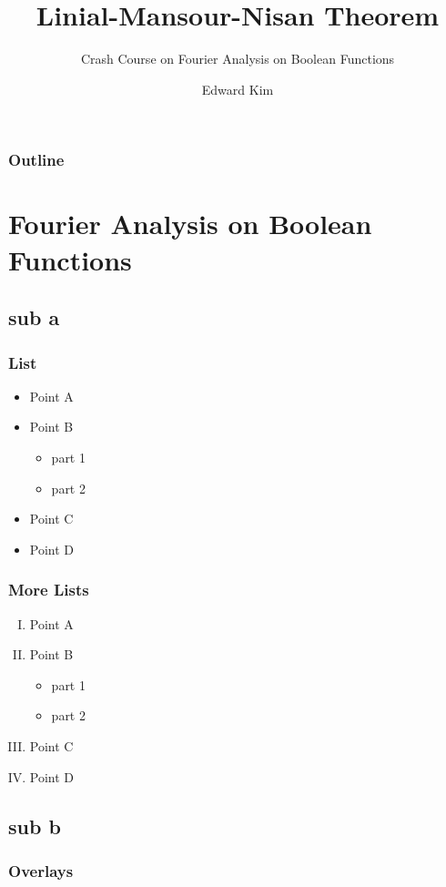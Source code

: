 \documentclass{beamer}
\title{Linial-Mansour-Nisan Theorem}
\subtitle{Crash Course on Fourier Analysis on Boolean Functions}
\author{Edward Kim}
\begin{document}
\begin{frame}
\titlepage
\end{frame}

\begin{frame}
\label{contents}
\frametitle{Outline}
\tableofcontents
\end{frame}

\section{Fourier Analysis on Boolean Functions}
\subsection{sub a}

\begin{frame}
\frametitle{List}
\begin{itemize}
\pause
\item Point A
\pause
\item Point B
\begin{itemize}
\pause
\item part 1
\pause
\item part 2
\end{itemize}
\pause
\item Point C
\pause
\item Point D
\end{itemize}
\end{frame}

\begin{frame}
\frametitle{More Lists}
\begin{enumerate}[(I)]
\item<1-> Point A
\item<2-> Point B
\begin{itemize}
\item<3-> part 1
\item<4-> part 2
\end{itemize}
\item<5-> Point C
\item<-2,4-5,7> Point D
\end{enumerate}
\end{frame}

\subsection{sub b}
\begin{frame}
\frametitle{Overlays}


\end{frame}
\end{document}
